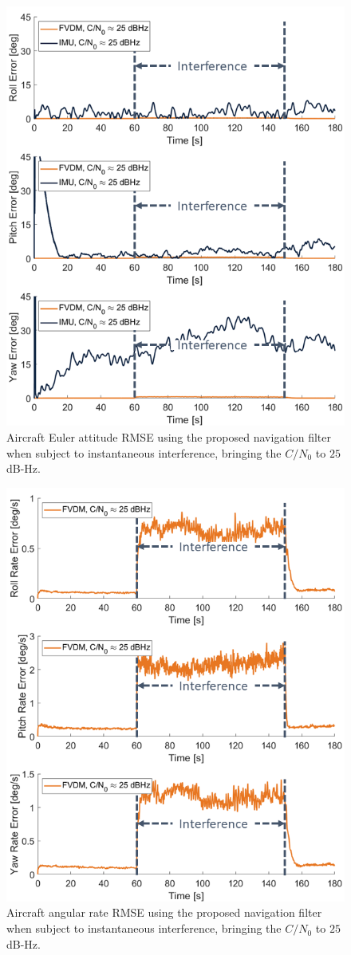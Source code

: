 \documentclass[12pt]{report}
\begin{document}
\begin{figure}[!ht]
  \centering
  \includegraphics[width=0.75\linewidth]{Figures/Results/trajectoryfigure/Slide4.PNG}
  \caption{Aircraft Euler attitude RMSE using the proposed navigation filter when subject to instantaneous interference, bringing the \(C/N_0\) to \(25\) dB-Hz.}\label{fig:Eul25}
\end{figure}


\begin{figure}[!ht]
  \centering
  \includegraphics[width=0.75\linewidth]{Figures/Results/trajectoryfigure/Slide10.PNG}
  \caption{Aircraft angular rate RMSE using the proposed navigation filter when subject to instantaneous interference, bringing the \(C/N_0\) to \(25\) dB-Hz.}\label{fig:Ang25}
\end{figure}
\end{document}

